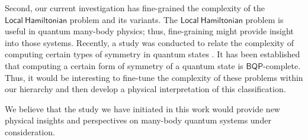 \documentclass[11pt]{article}
\begin{document}



Second, our current investigation has fine-grained the complexity of the $\mathsf{Local\ Hamiltonian}$ problem and its variants. The $\mathsf{Local\ Hamiltonian}$ problem is useful in quantum many-body physics; thus, fine-graining might provide insight into those systems.  Recently, a study was conducted to relate the complexity of computing certain types of symmetry in quantum states \cite{rethinasamy2024quantum}. It has been established that computing a certain form of symmetry of a quantum state is $\mathsf{BQP}$-complete. Thus, it would be interesting to fine-tune the complexity of these problems within our hierarchy and then develop a physical interpretation of this classification.\par
We believe that the study we have initiated in this work would provide new physical insights and perspectives on many-body quantum systems under consideration.
\end{document}
